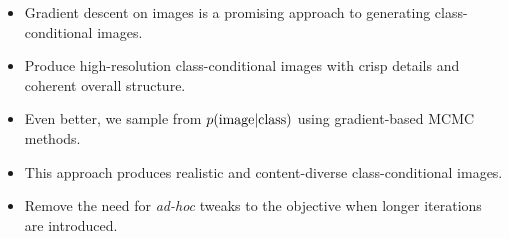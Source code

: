 \documentclass[landscape,a0b,final,a4resizeable]{include/a0poster}
\begin{document}
\begin{poster}
\begin{multicols}{3}
%
% 
\vspace{0.2in}
% 
\begin{itemize}
	\item Gradient descent on images is a promising approach to generating class-conditional images.
	\item Produce high-resolution class-conditional images with crisp details and coherent overall structure.
	\item Even better, we sample from $p(\textnormal{image} | \textnormal{class})$ using gradient-based MCMC methods.
	\item This approach produces realistic and content-diverse class-conditional images.
	\item Remove the need for \emph{ad-hoc} tweaks to the objective when longer iterations are introduced.
\end{itemize}


\end{multicols}
\end{poster}
\end{document}
